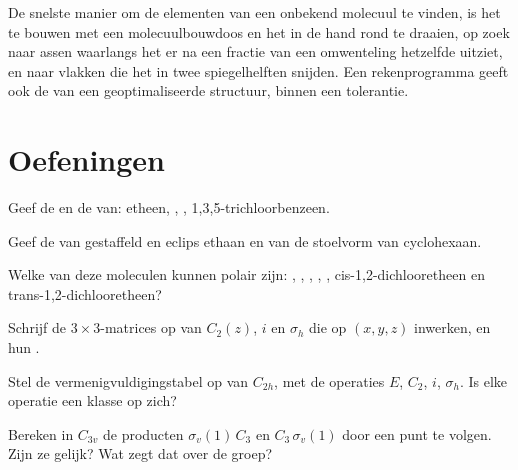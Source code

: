 \begin{inthelab}
De snelste manier om de elementen van een onbekend molecuul te vinden, is
het te bouwen met een molecuulbouwdoos en het in de hand rond te draaien,
op zoek naar assen waarlangs het er na een fractie van een omwenteling
hetzelfde uitziet, en naar vlakken die het in twee spiegelhelften
snijden. Een rekenprogramma geeft ook de  van een
geoptimaliseerde structuur, binnen een tolerantie.
\end{inthelab}

\section{Oefeningen}

\begin{exercise}[$\star$]\label{exo:b3:point-groups:1}
Geef de  en de  van: etheen, ,
, 1,3,5-trichloorbenzeen.
\end{exercise}

\begin{exercise}[$\star$]\label{exo:b3:point-groups:2}
Geef de  van gestaffeld en eclips ethaan en van de stoelvorm
van cyclohexaan.
\end{exercise}

\begin{exercise}[$\star$]\label{exo:b3:point-groups:3}
Welke van deze moleculen kunnen polair zijn: , , , , ,
cis-1,2-dichlooretheen en trans-1,2-dichlooretheen?
\end{exercise}

\begin{exercise}[$\star$]\label{exo:b3:point-groups:4}
Schrijf de $3\times3$-matrices op van $C_2(z)$, $i$ en $\sigma_h$ die op $(x, y, z)$
inwerken, en hun .
\end{exercise}

\begin{exercise}[$\star\star$]\label{exo:b3:point-groups:5}
Stel de vermenigvuldigingstabel op van $C_{2h}$, met de operaties $E$, $C_2$, $i$,
$\sigma_h$. Is elke operatie een klasse op zich?
\end{exercise}

\begin{exercise}[$\star\star$]\label{exo:b3:point-groups:6}
Bereken in $C_{3v}$ de producten $\sigma_v(1)\,C_3$ en $C_3\,\sigma_v(1)$ door
een punt te volgen. Zijn ze gelijk? Wat zegt dat over de groep?
\end{exercise}

